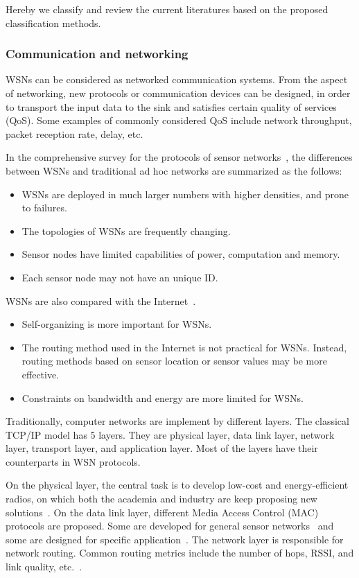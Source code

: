 Hereby we classify and review the current literatures based on the proposed classification methods.

\subsubsection{Communication and networking}
WSNs can be considered as networked communication systems. From the aspect of networking, new protocols or communication devices can be designed, in order to transport the input data to the sink and satisfies certain quality of services (QoS). Some examples of commonly considered QoS include network throughput, packet reception rate, delay, etc.

    In the comprehensive survey for the protocols of sensor networks~\cite{AkyildizSurveySN}, the differences between WSNs and traditional ad hoc networks are summarized as the follows:
\begin{itemize}
  \item WSNs are deployed in much larger numbers with higher densities, and prone to failures.
  \item The topologies of WSNs are frequently changing.
  \item Sensor nodes have limited capabilities of power, computation and memory.
  \item Each sensor node may not have an unique ID.
\end{itemize}


WSNs are also compared with the Internet~\cite{CullerOverviewWSN05,Estrin01Instrumenting}.
\begin{itemize}
  \item Self-organizing is more important for WSNs.
  \item The routing method used in the Internet is not practical for WSNs. Instead, routing methods based on sensor location or sensor values may be more effective.
  \item Constraints on bandwidth and energy are more limited for WSNs.
\end{itemize}


    Traditionally, computer networks are implement by different layers. The classical TCP/IP model has 5 layers. They are physical layer, data link layer, network layer, transport layer, and application layer. Most of the layers have their counterparts in WSN protocols.


    On the physical layer, the central task is to develop low-cost and energy-efficient radios, on which both the academia and industry are keep proposing new solutions~\cite{korber05embedding,Standard802.15.4.2003,SensicastEMS,White_Paper_nanoNET-2,Rabaey2000b}. On the data link layer, different Media Access Control (MAC) protocols are proposed. Some are developed for general sensor networks~\cite{YeSmac_infocom02} and some are designed  for specific application~\cite{VuranSpatioTemporal04}.
    The network layer is responsible for network routing. Common routing metrics include the number of hops, RSSI, and link quality, etc.~\cite{Multihop2003}. %

